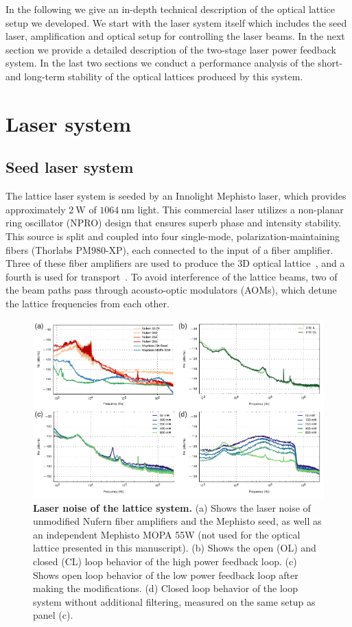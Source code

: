 \documentclass[twocolumn,aps,pra,showpacs,preprintnumbers,bibnotes]{revtex4-1}
\newcommand\unit[2]{\ensuremath{#1~\mathrm{{#2}}}}
\begin{document}
In the following we give an in-depth technical description of the optical lattice setup we developed. We start with the laser system itself which includes the seed laser, amplification and optical setup for controlling the laser beams. In the next section we provide a detailed description of the two-stage laser power feedback system. In the last two sections we conduct a performance analysis of the short- and long-term stability of the optical lattices produced by this system.

\section{Laser system}
\subsection{Seed laser system}
The lattice laser system is seeded by an Innolight Mephisto laser, which provides approximately \unit{2}{W} of \unit{1064}{nm} light.
This commercial laser utilizes a non-planar ring oscillator (NPRO) design that ensures superb phase and intensity stability.
This source is split and coupled into four single-mode, polarization-maintaining fibers (Thorlabs PM980-XP), each connected to the input of a fiber amplifier.
Three of these fiber amplifiers are used to produce the 3D optical lattice~\cite{Blatt2015,Parsons2016}, and a fourth is used for transport~\cite{Huber2014}.
To avoid interference of the lattice beams, two of the beam paths pass through acousto-optic modulators (AOMs), which detune the lattice frequencies from each other.

\begin{figure}
  \begin{center}
    \includegraphics{Figure2.pdf}
    \caption{\textbf{Laser noise of the lattice system.} (a) Shows the laser noise of unmodified Nufern fiber amplifiers and the Mephisto seed, as well as an independent Mephisto MOPA 55W (not used for the optical lattice presented in this manuscript). (b) Shows the open (OL) and closed (CL) loop behavior of the high power feedback loop. (c) Shows open loop behavior of the low power feedback loop after making the modifications. (d) Closed loop behavior of the loop system without additional filtering, measured on the same setup as panel (c).}\label{fig:noises}
  \end{center}
\end{figure}
\end{document}
